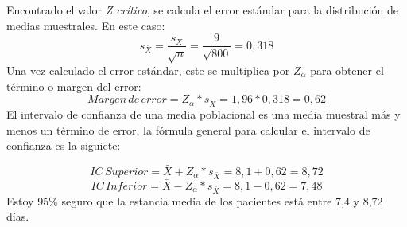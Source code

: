 \documentclass[letterpaper]{article}
\begin{document}
\begin{itemize}
\begin{center}
	\end{center}
	Encontrado el valor \emph{Z crítico}, se calcula el error estándar para la distribución de medias muestrales. En este caso:
	$$s_{\bar{X}}=\dfrac{s_X}{\sqrt{n}}=\dfrac{9}{\sqrt{800}}=0,318$$
	Una vez calculado el error estándar, este se multiplica por $Z_{\alpha}$ para obtener el término o margen del error:
	$$Margen\, de\, error=Z_{\alpha}*s_{\bar{X}}=1,96*0,318=0,62$$
	El intervalo de confianza de una media poblacional es una media muestral más y menos un término de error, la fórmula general para calcular el intervalo de confianza es la siguiete:
	
	$$IC\, Superior=\bar{X}+Z_{\alpha}*s_{\bar{X}}=8,1+0,62=8,72$$
	$$IC\, Inferior=\bar{X}-Z_{\alpha}*s_{\bar{X}}=8,1-0,62=7,48$$
	Estoy 95\% seguro que la estancia media de los pacientes está entre 7,4 y 8,72 días.
\end{itemize}
\end{document}
